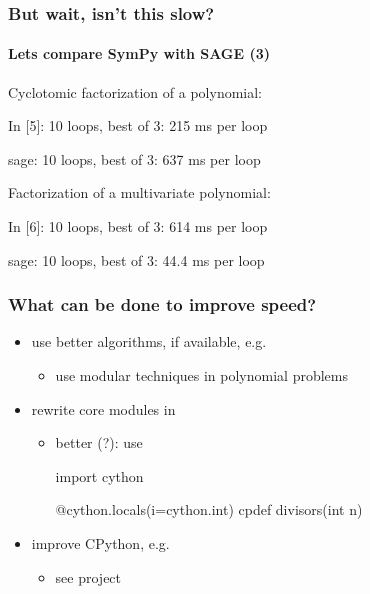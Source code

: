 \documentclass[handout]{beamer}
\begin{document}
\begin{frame}[fragile]
    \frametitle{But wait, isn't this slow?}
    \framesubtitle{Lets compare SymPy with SAGE (3)}

    Cyclotomic factorization of a polynomial:
    \begin{python}
In [5]: %
10 loops, best of 3: 215 ms per loop
    \end{python}
    \begin{python}
sage: %
10 loops, best of 3: 637 ms per loop
    \end{python}

    Factorization of a multivariate polynomial:
    \begin{python}
In [6]: %
10 loops, best of 3: 614 ms per loop
    \end{python}
    \begin{python}
sage: %
10 loops, best of 3: 44.4 ms per loop
    \end{python}
\end{frame}

\begin{frame}[fragile]
    \frametitle{What can be done to improve speed?}

    \begin{itemize}
        \item use better algorithms, if available, e.g.
        \begin{itemize}
            \item use modular techniques in polynomial problems
        \end{itemize}
        \item rewrite core modules in 
        \begin{itemize}
            \item better (?): use 
\begin{python}
import cython

@cython.locals(i=cython.int)
cpdef divisors(int n)
\end{python}
        \end{itemize}
        \item improve CPython, e.g.
        \begin{itemize}
            \item see  project
        \end{itemize}
    \end{itemize}
\end{frame}
\end{document}
